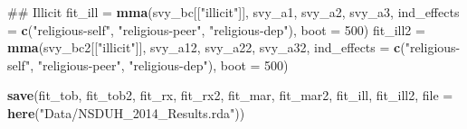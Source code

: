\documentclass[]{DissertateUSU}
\newenvironment{Shaded}{\begin{snugshade}}{\end{snugshade}}
\newcommand{\KeywordTok}[1]{\textcolor[rgb]{0.13,0.29,0.53}{\textbf{#1}}}
\newcommand{\DataTypeTok}[1]{\textcolor[rgb]{0.13,0.29,0.53}{#1}}
\newcommand{\DecValTok}[1]{\textcolor[rgb]{0.00,0.00,0.81}{#1}}
\newcommand{\StringTok}[1]{\textcolor[rgb]{0.31,0.60,0.02}{#1}}
\newcommand{\NormalTok}[1]{#1}
\begin{document}
\begin{Shaded}
\begin{Highlighting}[]
\NormalTok{## Illicit}
\NormalTok{fit_ill =}\StringTok{ }\KeywordTok{mma}\NormalTok{(svy_bc[[}\StringTok{"illicit"}\NormalTok{]],}
\NormalTok{              svy_a1,}
\NormalTok{              svy_a2,}
\NormalTok{              svy_a3,}
              \DataTypeTok{ind_effects =} \KeywordTok{c}\NormalTok{(}\StringTok{"religious-self"}\NormalTok{,}
                              \StringTok{"religious-peer"}\NormalTok{,}
                              \StringTok{"religious-dep"}\NormalTok{),}
              \DataTypeTok{boot =} \DecValTok{500}\NormalTok{)}
\NormalTok{fit_ill2 =}\StringTok{ }\KeywordTok{mma}\NormalTok{(svy_bc2[[}\StringTok{"illicit"}\NormalTok{]],}
\NormalTok{               svy_a12,}
\NormalTok{               svy_a22,}
\NormalTok{               svy_a32,}
               \DataTypeTok{ind_effects =} \KeywordTok{c}\NormalTok{(}\StringTok{"religious-self"}\NormalTok{,}
                               \StringTok{"religious-peer"}\NormalTok{,}
                               \StringTok{"religious-dep"}\NormalTok{),}
               \DataTypeTok{boot =} \DecValTok{500}\NormalTok{)}

\KeywordTok{save}\NormalTok{(fit_tob, fit_tob2, }
\NormalTok{     fit_rx, fit_rx2, }
\NormalTok{     fit_mar, fit_mar2, }
\NormalTok{     fit_ill, fit_ill2,}
     \DataTypeTok{file =} \KeywordTok{here}\NormalTok{(}\StringTok{"Data/NSDUH_2014_Results.rda"}\NormalTok{))}
\end{Highlighting}
\end{Shaded}
\end{document}
